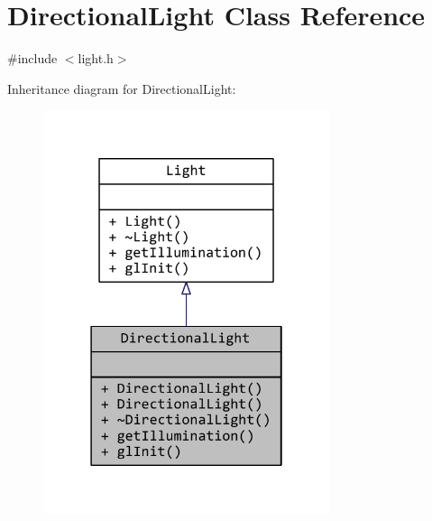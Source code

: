 \hypertarget{classDirectionalLight}{\section{Directional\+Light Class Reference}
\label{classDirectionalLight}
}


{\ttfamily \#include $<$light.\+h$>$}



Inheritance diagram for Directional\+Light\+:
\nopagebreak
\begin{figure}[H]
\begin{center}
\leavevmode
\includegraphics[width=238pt]{classDirectionalLight__inherit__graph}
\end{center}
\end{figure}


